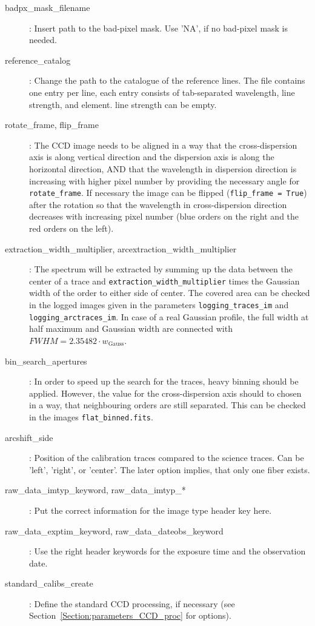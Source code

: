 \documentclass[10pt,a4paper]{article}
\begin{document}
\begin{description}
  \item[badpx\_mask\_filename] : Insert path to the bad-pixel mask. Use 'NA', if no bad-pixel mask is needed.
  \item[reference\_catalog] : Change the path to the catalogue of the reference lines. The file contains one entry per line, each entry consists of tab-separated wavelength, line strength, and element. line strength can be empty.
  \item[rotate\_frame, flip\_frame] : The CCD image needs to be aligned in a way that the cross-dispersion axis is along vertical direction and the dispersion axis is along the horizontal direction, AND that the wavelength in dispersion direction is increasing with higher pixel number by providing the necessary angle for \verb|rotate_frame|. If necessary the image can be flipped (\verb|flip_frame = True|) after the rotation so that the wavelength in cross-dispersion direction decreases with increasing pixel number (blue orders on the right and the red orders on the left).
  \item[extraction\_width\_multiplier, arcextraction\_width\_multiplier] : The spectrum will be extracted by summing up the data between the center of a trace and \verb|extraction_width_multiplier| times the Gaussian width of the order to either side of center. The covered area can be checked in the logged images given in the parameters \verb|logging_traces_im| and \verb|logging_arctraces_im|. In case of a real Gaussian profile, the full width at half maximum and Gaussian width are connected with $FWHM = 2.35482\cdot w_{\mathrm{Gauss}}$.
  \item[bin\_search\_apertures] : In order to speed up the search for the traces, heavy binning should be applied. However, the value for the cross-dispersion axis should to chosen in a way, that neighbouring orders are still separated. This can be checked in the images \verb|flat_binned.fits|.
  \item[arcshift\_side] : Position of the calibration traces compared to the science traces. Can be 'left', 'right', or 'center'. The later option implies, that only one fiber exists.
  \item[raw\_data\_imtyp\_keyword, raw\_data\_imtyp\_*] : Put the correct information for the image type header key here. 
  \item[raw\_data\_exptim\_keyword, raw\_data\_dateobs\_keyword] : Use the right header keywords for the exposure time and the observation date.
  \item[standard\_calibs\_create] : Define the standard CCD processing, if necessary (see Section~\ref{Section:parameters_CCD_proc} for options).
\end{description}
\end{document}
